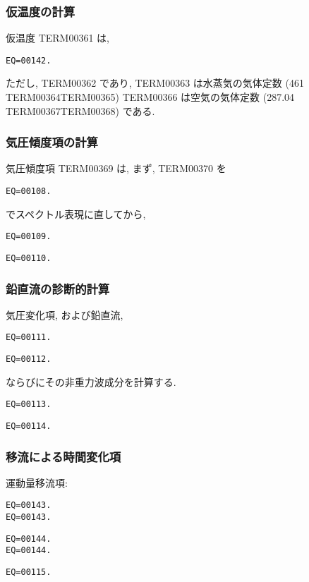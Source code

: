 \subsubsection{仮温度の計算}

仮温度 TERM00361 は, 
\begin{verbatim}
EQ=00142.
\end{verbatim}
ただし, TERM00362 であり, 
TERM00363 は水蒸気の気体定数
(461 TERM00364TERM00365)
TERM00366 は空気の気体定数
(287.04 TERM00367TERM00368)
である.

\subsubsection{気圧傾度項の計算}

気圧傾度項 TERM00369 は,
まず, TERM00370 を
\begin{verbatim}
EQ=00108.
\end{verbatim}
でスペクトル表現に直してから,
\begin{verbatim}
EQ=00109.
\end{verbatim}
\begin{verbatim}
EQ=00110.
\end{verbatim}

\subsubsection{鉛直流の診断的計算}

気圧変化項, および鉛直流,
\begin{verbatim}
EQ=00111.
\end{verbatim}
%
\begin{verbatim}
EQ=00112.
\end{verbatim}
%
ならびにその非重力波成分を計算する.
%
\begin{verbatim}
EQ=00113.
\end{verbatim}
%
\begin{verbatim}
EQ=00114.
\end{verbatim}

\subsubsection{移流による時間変化項}

運動量移流項:
\begin{verbatim}
EQ=00143.
EQ=00143.
\end{verbatim}
%
\begin{verbatim}
EQ=00144.
EQ=00144.
\end{verbatim}
\begin{verbatim}
EQ=00115.
\end{verbatim}

